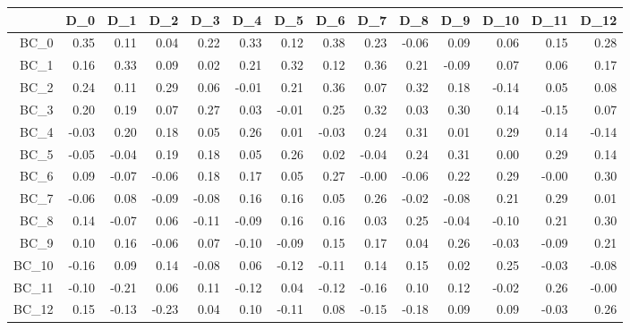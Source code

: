 \documentclass[10pt,a4paper]{article}\usepackage[]{graphicx}\usepackage[]{color}
\begin{document}
\begin{table}[ht]
\centering
\begin{tabular}{rrrrrrrrrrrrrr}
  \hline
 & D\_0 & D\_1 & D\_2 & D\_3 & D\_4 & D\_5 & D\_6 & D\_7 & D\_8 & D\_9 & D\_10 & D\_11 & D\_12 \\ 
  \hline
BC\_0 & 0.35 & 0.11 & 0.04 & 0.22 & 0.33 & 0.12 & 0.38 & 0.23 & -0.06 & 0.09 & 0.06 & 0.15 & 0.28 \\ 
  BC\_1 & 0.16 & 0.33 & 0.09 & 0.02 & 0.21 & 0.32 & 0.12 & 0.36 & 0.21 & -0.09 & 0.07 & 0.06 & 0.17 \\ 
  BC\_2 & 0.24 & 0.11 & 0.29 & 0.06 & -0.01 & 0.21 & 0.36 & 0.07 & 0.32 & 0.18 & -0.14 & 0.05 & 0.08 \\ 
  BC\_3 & 0.20 & 0.19 & 0.07 & 0.27 & 0.03 & -0.01 & 0.25 & 0.32 & 0.03 & 0.30 & 0.14 & -0.15 & 0.07 \\ 
  BC\_4 & -0.03 & 0.20 & 0.18 & 0.05 & 0.26 & 0.01 & -0.03 & 0.24 & 0.31 & 0.01 & 0.29 & 0.14 & -0.14 \\ 
  BC\_5 & -0.05 & -0.04 & 0.19 & 0.18 & 0.05 & 0.26 & 0.02 & -0.04 & 0.24 & 0.31 & 0.00 & 0.29 & 0.14 \\ 
  BC\_6 & 0.09 & -0.07 & -0.06 & 0.18 & 0.17 & 0.05 & 0.27 & -0.00 & -0.06 & 0.22 & 0.29 & -0.00 & 0.30 \\ 
  BC\_7 & -0.06 & 0.08 & -0.09 & -0.08 & 0.16 & 0.16 & 0.05 & 0.26 & -0.02 & -0.08 & 0.21 & 0.29 & 0.01 \\ 
  BC\_8 & 0.14 & -0.07 & 0.06 & -0.11 & -0.09 & 0.16 & 0.16 & 0.03 & 0.25 & -0.04 & -0.10 & 0.21 & 0.30 \\ 
  BC\_9 & 0.10 & 0.16 & -0.06 & 0.07 & -0.10 & -0.09 & 0.15 & 0.17 & 0.04 & 0.26 & -0.03 & -0.09 & 0.21 \\ 
  BC\_10 & -0.16 & 0.09 & 0.14 & -0.08 & 0.06 & -0.12 & -0.11 & 0.14 & 0.15 & 0.02 & 0.25 & -0.03 & -0.08 \\ 
  BC\_11 & -0.10 & -0.21 & 0.06 & 0.11 & -0.12 & 0.04 & -0.12 & -0.16 & 0.10 & 0.12 & -0.02 & 0.26 & -0.00 \\ 
  BC\_12 & 0.15 & -0.13 & -0.23 & 0.04 & 0.10 & -0.11 & 0.08 & -0.15 & -0.18 & 0.09 & 0.09 & -0.03 & 0.26 \\ 
   \hline
\end{tabular}
\end{table}
\end{document}
